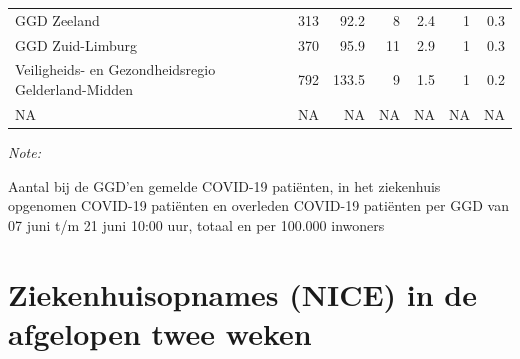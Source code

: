 \documentclass[
  english,
  man,floatsintext]{apa6}
\begin{document}
\begin{table}
\begin{threeparttable}
\begin{tabular}{lrrrrrr}
GGD Zeeland & 313 & 92.2 & 8 & 2.4 & 1 & 0.3\\
GGD Zuid-Limburg & 370 & 95.9 & 11 & 2.9 & 1 & 0.3\\
Veiligheids- en Gezondheidsregio Gelderland-Midden & 792 & 133.5 & 9 & 1.5 & 1 & 0.2\\
NA & NA & NA & NA & NA & NA & NA\\
\bottomrule
\end{tabular}
\begin{tablenotes}
\item \textit{Note: } 
\item Aantal bij de GGD’en gemelde COVID-19 patiënten, in het ziekenhuis opgenomen COVID-19 patiënten en overleden COVID-19 patiënten per GGD van 07 juni t/m 21 juni 10:00 uur, totaal en per 100.000 inwoners
\end{tablenotes}
\end{threeparttable}
\endgroup{}
\end{table}

\newpage

\hypertarget{ziekenhuisopnames-nice-in-de-afgelopen-twee-weken}{%
\section{Ziekenhuisopnames (NICE) in de afgelopen twee weken}\label{ziekenhuisopnames-nice-in-de-afgelopen-twee-weken}}
\end{document}
